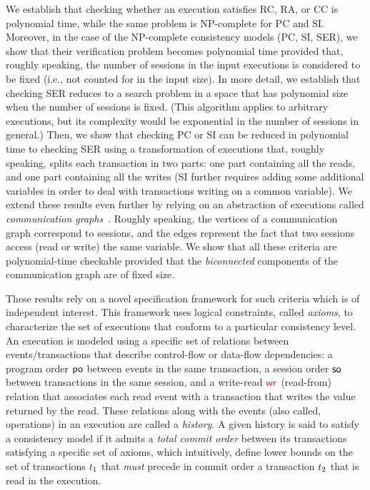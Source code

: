 We establish that checking whether an execution satisfies RC, RA, or CC is polynomial time, while the same problem is NP-complete for PC and SI. Moreover, in the case of the NP-complete consistency models (PC, SI, SER), we show that their verification problem becomes polynomial time provided that, roughly speaking, the number of sessions in the input executions is considered to be fixed (i.e., not counted for in the input size). In more detail, we establish that checking SER reduces to a search problem in a space that has polynomial size when the number of sessions is fixed. (This algorithm applies to arbitrary executions, but its complexity would be exponential in the number of sessions in general.) Then, we show that checking PC or SI can be reduced in polynomial time to checking SER using a transformation of executions that, roughly speaking, splits each transaction in two parts: one part containing all the reads, and one part containing all the writes (SI further requires adding some additional variables in order to deal with transactions writing on a common variable).
We extend these results even further by relying on an abstraction of executions called \emph{communication graphs}~\cite{DBLP:journals/pacmpl/ChalupaCPSV18}. Roughly speaking, the vertices of a communication graph correspond to sessions, and the edges represent the fact that two sessions access (read or write) the same variable. We show that all these criteria are polynomial-time checkable provided that the \emph{biconnected} components of the communication graph are of fixed size. 

These results rely on a novel specification framework for such criteria which is of independent interest. 
This framework uses logical constraints, called \emph{axioms}, to characterize the
set of executions that conform to a particular consistency level. An execution is modeled using a specific set of
relations between events/transactions that describe control-flow
or data-flow dependencies: a program order $\mathsf{po}$ between events in the same
transaction, a session order $\mathsf{so}$ between transactions in the same session, 
and a write-read $\textcolor{red}{\mathsf{wr}_{}}$ (read-from) relation that
associates each read event with a transaction that writes the value returned by
the read. These relations along with the events (also called, operations) in an
execution are called a \emph{history}. 
A given history is said to satisfy a consistency model if it admits a \emph{total commit order} between its transactions
satisfying a specific set of axioms, which intuitively, 
define lower bounds on the set of transactions ${t}_1$ that \emph{must} precede in commit 
order a transaction ${t}_2$ that is read in the execution. 


